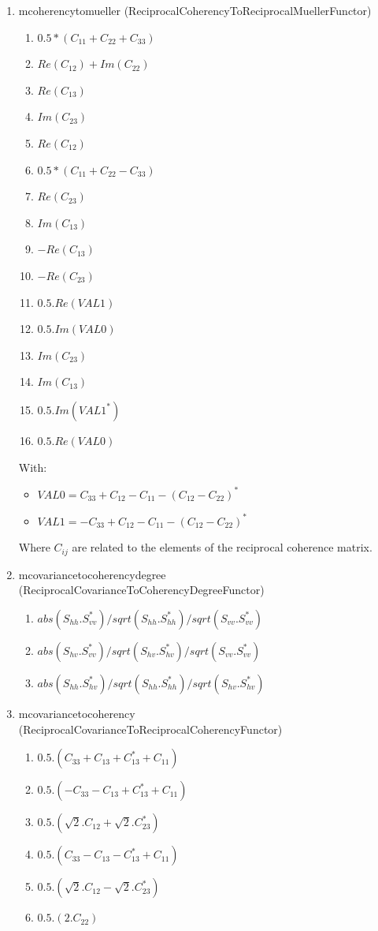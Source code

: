 \begin{enumerate}
\item mcoherencytomueller (ReciprocalCoherencyToReciprocalMuellerFunctor)
\begin{enumerate}
\item $ 0.5*( C_{11}+C_{22}+C_{33} ) $ 
\item $ Re(C_{12}) + Im(C_{22}) $ 
\item $ Re(C_{13}) $ 
\item $ Im(C_{23}) $ 
\item $ Re(C_{12}) $ 
\item $ 0.5*( C_{11}+C_{22}-C_{33} ) $ 
\item $ Re(C_{23}) $ 
\item $ Im(C_{13}) $ 
\item $ -Re(C_{13}) $ 
\item $ -Re(C_{23}) $
\item $ 0.5.Re(VAL1) $
\item $ 0.5.Im(VAL0) $
\item $ Im(C_{23}) $
\item $ Im(C_{13}) $
\item $ 0.5.Im(VAL1^{*}) $
\item $ 0.5.Re(VAL0) $
\end{enumerate}

With:
\begin{itemize} 
\item $ VAL0 = C_{33}+C_{12}-C_{11}-(C_{12}-C_{22})^{*}  $ 
\item $ VAL1 = -C_{33}+C_{12}-C_{11}-(C_{12}-C_{22})^{*} $ 
\end{itemize}

Where $C_{ij}$ are related to the elements of the reciprocal coherence matrix.
 
 
\item mcovariancetocoherencydegree (ReciprocalCovarianceToCoherencyDegreeFunctor)
\begin{enumerate}
\item $ abs(S_{hh}.S_{vv}^{*}) / sqrt(S_{hh}.S_{hh}^{*}) / sqrt(S_{vv}.S_{vv}^{*}) $ 
\item $ abs(S_{hv}.S_{vv}^{*}) / sqrt(S_{hv}.S_{hv}^{*}) / sqrt(S_{vv}.S_{vv}^{*}) $ 
\item $ abs(S_{hh}.S_{hv}^{*}) / sqrt(S_{hh}.S_{hh}^{*}) / sqrt(S_{hv}.S_{hv}^{*}) $
\end{enumerate}
 
\item mcovariancetocoherency (ReciprocalCovarianceToReciprocalCoherencyFunctor)
\begin{enumerate}
\item $ 0.5 . ( C_{33} + C_{13} + C_{13}^{*} + C_{11} ) $ 
\item $ 0.5 . ( -C_{33} - C_{13} + C_{13}^{*} + C_{11} ) $ 
\item $ 0.5 . ( \sqrt{2}.C_{12} + \sqrt{2}.C_{23}^{*} ) $ 
\item $ 0.5 . ( C_{33} - C_{13} - C_{13}^{*} + C_{11} ) $ 
\item $ 0.5 . ( \sqrt{2}.C_{12} - \sqrt{2}.C_{23}^{*} ) $ 
\item $ 0.5 . ( 2 . C_{22} ) $
\end{enumerate}


\end{enumerate}
